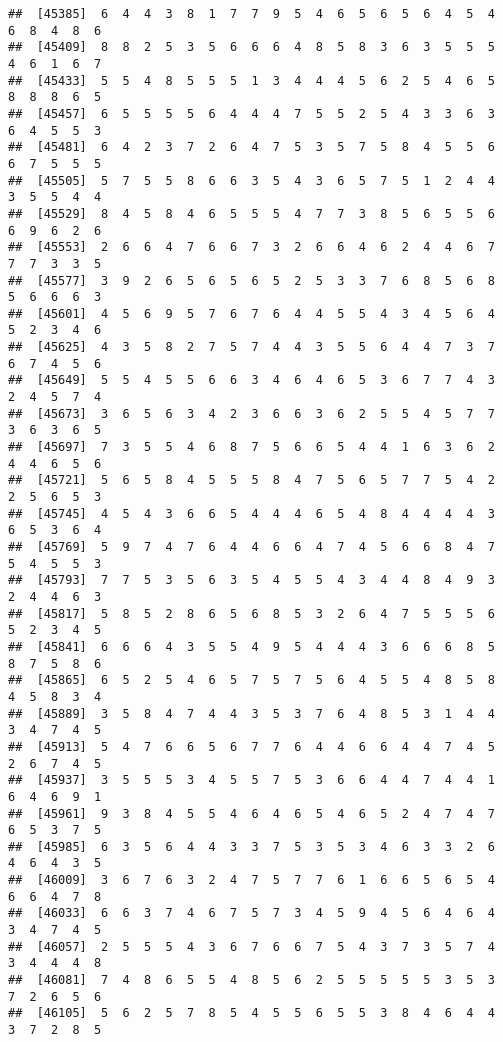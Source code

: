 \documentclass[
]{book}
\begin{document}
\begin{verbatim}
##  [45385]  6  4  4  3  8  1  7  7  9  5  4  6  5  6  5  6  4  5  4  6  8  4  8  6
##  [45409]  8  8  2  5  3  5  6  6  6  4  8  5  8  3  6  3  5  5  5  4  6  1  6  7
##  [45433]  5  5  4  8  5  5  5  1  3  4  4  4  5  6  2  5  4  6  5  8  8  8  6  5
##  [45457]  6  5  5  5  5  6  4  4  4  7  5  5  2  5  4  3  3  6  3  6  4  5  5  3
##  [45481]  6  4  2  3  7  2  6  4  7  5  3  5  7  5  8  4  5  5  6  6  7  5  5  5
##  [45505]  5  7  5  5  8  6  6  3  5  4  3  6  5  7  5  1  2  4  4  3  5  5  4  4
##  [45529]  8  4  5  8  4  6  5  5  5  4  7  7  3  8  5  6  5  5  6  6  9  6  2  6
##  [45553]  2  6  6  4  7  6  6  7  3  2  6  6  4  6  2  4  4  6  7  7  7  3  3  5
##  [45577]  3  9  2  6  5  6  5  6  5  2  5  3  3  7  6  8  5  6  8  5  6  6  6  3
##  [45601]  4  5  6  9  5  7  6  7  6  4  4  5  5  4  3  4  5  6  4  5  2  3  4  6
##  [45625]  4  3  5  8  2  7  5  7  4  4  3  5  5  6  4  4  7  3  7  6  7  4  5  6
##  [45649]  5  5  4  5  5  6  6  3  4  6  4  6  5  3  6  7  7  4  3  2  4  5  7  4
##  [45673]  3  6  5  6  3  4  2  3  6  6  3  6  2  5  5  4  5  7  7  3  6  3  6  5
##  [45697]  7  3  5  5  4  6  8  7  5  6  6  5  4  4  1  6  3  6  2  4  4  6  5  6
##  [45721]  5  6  5  8  4  5  5  5  8  4  7  5  6  5  7  7  5  4  2  2  5  6  5  3
##  [45745]  4  5  4  3  6  6  5  4  4  4  6  5  4  8  4  4  4  4  3  6  5  3  6  4
##  [45769]  5  9  7  4  7  6  4  4  6  6  4  7  4  5  6  6  8  4  7  5  4  5  5  3
##  [45793]  7  7  5  3  5  6  3  5  4  5  5  4  3  4  4  8  4  9  3  2  4  4  6  3
##  [45817]  5  8  5  2  8  6  5  6  8  5  3  2  6  4  7  5  5  5  6  5  2  3  4  5
##  [45841]  6  6  6  4  3  5  5  4  9  5  4  4  4  3  6  6  6  8  5  8  7  5  8  6
##  [45865]  6  5  2  5  4  6  5  7  5  7  5  6  4  5  5  4  8  5  8  4  5  8  3  4
##  [45889]  3  5  8  4  7  4  4  3  5  3  7  6  4  8  5  3  1  4  4  3  4  7  4  5
##  [45913]  5  4  7  6  6  5  6  7  7  6  4  4  6  6  4  4  7  4  5  2  6  7  4  5
##  [45937]  3  5  5  5  3  4  5  5  7  5  3  6  6  4  4  7  4  4  1  6  4  6  9  1
##  [45961]  9  3  8  4  5  5  4  6  4  6  5  4  6  5  2  4  7  4  7  6  5  3  7  5
##  [45985]  6  3  5  6  4  4  3  3  7  5  3  5  3  4  6  3  3  2  6  4  6  4  3  5
##  [46009]  3  6  7  6  3  2  4  7  5  7  7  6  1  6  6  5  6  5  4  6  6  4  7  8
##  [46033]  6  6  3  7  4  6  7  5  7  3  4  5  9  4  5  6  4  6  4  3  4  7  4  5
##  [46057]  2  5  5  5  4  3  6  7  6  6  7  5  4  3  7  3  5  7  4  3  4  4  4  8
##  [46081]  7  4  8  6  5  5  4  8  5  6  2  5  5  5  5  5  3  5  3  7  2  6  5  6
##  [46105]  5  6  2  5  7  8  5  4  5  5  6  5  5  3  8  4  6  4  4  3  7  2  8  5

\end{verbatim}
\end{document}
